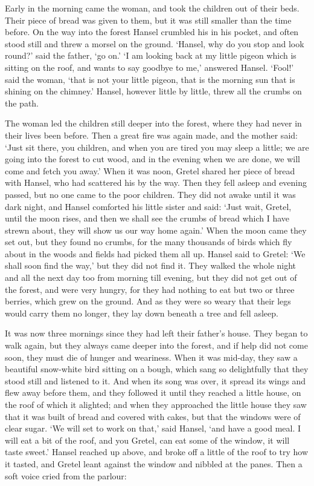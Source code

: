 \documentclass[oneside,11pt]{memoir} %
\begin{document}
	Early in the morning came the woman, and took the children out of their beds. Their piece of bread was given to them, but it was still smaller than the time before. On the way into the forest Hansel crumbled his in his pocket, and often stood still and threw a morsel on the ground. `Hansel, why do you stop and look round?' said the father, `go on.' `I am looking back at my little pigeon which is sitting on the roof, and wants to say goodbye to me,' answered Hansel. `Fool!' said the woman, `that is not your little pigeon, that is the morning sun that is shining on the chimney.' Hansel, however little by little, threw all the crumbs on the path.
	
	The woman led the children still deeper into the forest, where they had never in their lives been before. Then a great fire was again made, and the mother said: `Just sit there, you children, and when you are tired you may sleep a little; we are going into the forest to cut wood, and in the evening when we are done, we will come and fetch you away.' When it was noon, Gretel shared her piece of bread with Hansel, who had scattered his by the way. Then they fell asleep and evening passed, but no one came to the poor children. They did not awake until it was dark night, and Hansel comforted his little sister and said: `Just wait, Gretel, until the moon rises, and then we shall see the crumbs of bread which I have strewn about, they will show us our way home again.' When the moon came they set out, but they found no crumbs, for the many thousands of birds which fly about in the woods and fields had picked them all up. Hansel said to Gretel: `We shall soon find the way,' but they did not find it. They walked the whole night and all the next day too from morning till evening, but they did not get out of the forest, and were very hungry, for they had nothing to eat but two or three berries, which grew on the ground. And as they were so weary that their legs would carry them no longer, they lay down beneath a tree and fell asleep.
	
	It was now three mornings since they had left their father's house. They began to walk again, but they always came deeper into the forest, and if help did not come soon, they must die of hunger and weariness. When it was mid-day, they saw a beautiful snow-white bird sitting on a bough, which sang so delightfully that they stood still and listened to it. And when its song was over, it spread its wings and flew away before them, and they followed it until they reached a little house, on the roof of
	which it alighted; and when they approached the little house they saw that it was built of bread and covered with cakes, but that the windows were of clear sugar. `We will set to work on that,' said Hansel, `and have a good meal. I will eat a bit of the roof, and you Gretel, can eat some of the window, it will taste sweet.' Hansel reached up above, and broke off a little of the roof to try how it tasted, and Gretel leant against the window and nibbled at the panes. Then a soft voice cried
	from the parlour:
	
\end{document}
